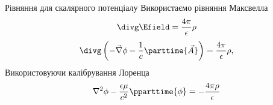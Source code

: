 \documentclass[9pt]{beamer}
\let\vect\vec
\begin{document}
\begin{frame}{Рівняння для скалярного потенціалу}{}
	Використаємо рівняння Максвелла
	\begin{equation*}
		\divg\Efield = \frac{4\pi}{\epsilon} \rho
	\end{equation*}
	\begin{equation*}
		\divg \left( -\vect{\nabla}\phi - \frac1c\parttime{\vect{A}} \right) = \frac{4\pi}{\epsilon} \rho,
	\end{equation*}
	Використовуючи калібрування Лоренца
	\begin{equation*}
		\nabla^2\phi - \frac{ \epsilon\mu }{c^2} \pparttime{\phi} = - \frac{4\pi\rho}{\epsilon}
	\end{equation*}
\end{frame}
\end{document}

